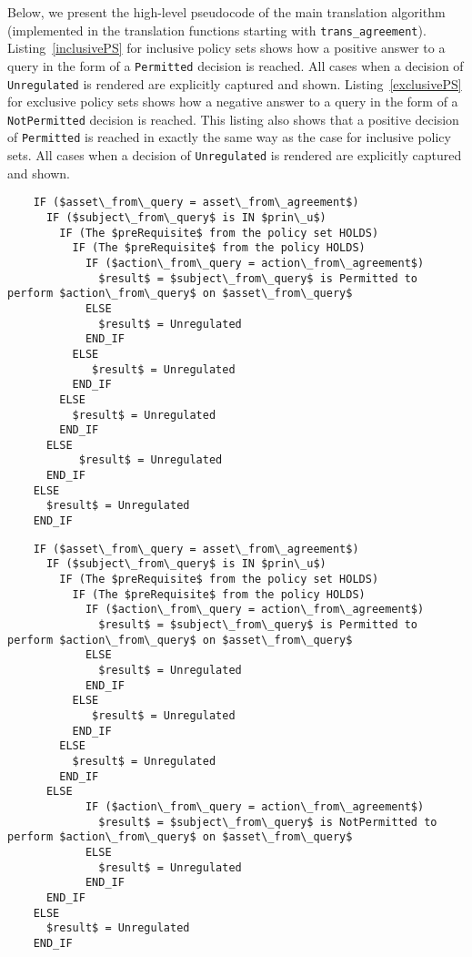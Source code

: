 \documentclass[runningheads,a4paper]{llncs}
\newcommand{\syn}{\texttt}
\begin{document}
 
Below, we present the high-level pseudocode of the main translation algorithm (implemented in the translation functions starting with \syn{trans_agreement}).
%
Listing~\ref{inclusivePS} for inclusive policy sets shows how a positive answer to a query in the form of a \syn{Permitted} decision is reached. All cases when a decision of \syn{Unregulated} is rendered are explicitly captured and shown. Listing~\ref{exclusivePS} for exclusive policy sets shows how a negative answer to a query in the form of a \syn{NotPermitted} decision is reached. This listing also shows that a positive decision of \syn{Permitted} is reached in exactly the same way as the case for inclusive policy sets. All cases when a decision of \syn{Unregulated} is rendered are explicitly captured and shown.

\begin{lstlisting}
    IF ($asset\_from\_query = asset\_from\_agreement$)
      IF ($subject\_from\_query$ is IN $prin\_u$)
        IF (The $preRequisite$ from the policy set HOLDS)
          IF (The $preRequisite$ from the policy HOLDS)
            IF ($action\_from\_query = action\_from\_agreement$)
              $result$ = $subject\_from\_query$ is Permitted to perform $action\_from\_query$ on $asset\_from\_query$
            ELSE
              $result$ = Unregulated
            END_IF            
          ELSE
             $result$ = Unregulated
          END_IF
        ELSE
          $result$ = Unregulated
        END_IF
      ELSE
           $result$ = Unregulated
      END_IF
    ELSE
      $result$ = Unregulated
    END_IF
\end{lstlisting}

\begin{lstlisting}
    IF ($asset\_from\_query = asset\_from\_agreement$)
      IF ($subject\_from\_query$ is IN $prin\_u$)
        IF (The $preRequisite$ from the policy set HOLDS)
          IF (The $preRequisite$ from the policy HOLDS)
            IF ($action\_from\_query = action\_from\_agreement$)
              $result$ = $subject\_from\_query$ is Permitted to perform $action\_from\_query$ on $asset\_from\_query$
            ELSE
              $result$ = Unregulated
            END_IF            
          ELSE
             $result$ = Unregulated
          END_IF
        ELSE
          $result$ = Unregulated
        END_IF
      ELSE
            IF ($action\_from\_query = action\_from\_agreement$)
              $result$ = $subject\_from\_query$ is NotPermitted to perform $action\_from\_query$ on $asset\_from\_query$
            ELSE
              $result$ = Unregulated
            END_IF
      END_IF
    ELSE
      $result$ = Unregulated
    END_IF
\end{lstlisting}
\pagebreak
\end{document}
